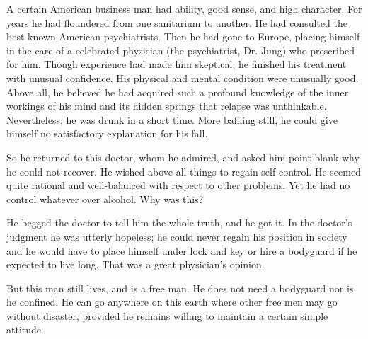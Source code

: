 \begin{biblechapter}
    A certain American business man had ability, 
    good sense, 
    and high character. 
\verse For years he had floundered from one sanitarium to another. 
\verse He had consulted the best known American psychiatrists. 
\verse Then he had gone to Europe, 
    placing himself in the care of a celebrated physician 
    (the psychiatrist, Dr. Jung) 
    who prescribed for him. 
\verse Though experience had made him skeptical, 
    he finished his treatment with unusual confidence. 
\verse His physical and mental condition were unusually good. 
\verse Above all, he believed he had acquired such a profound knowledge 
    of the inner workings of his mind 
    and its hidden springs that relapse was unthinkable. 
\verse Nevertheless, he was drunk in a short time. 
\verse More baffling still, 
    he could give himself no satisfactory explanation for his fall.

\verse So he returned to this doctor, whom he admired, 
    and asked him point-blank why he could not recover. 
\verse He wished above all things to regain self-control. 
\verse He seemed quite rational and well-balanced 
    with respect to other problems. 
\verse Yet he had no control whatever over alcohol. 
\verse Why was this?

\verse He begged the doctor to tell him the whole truth, and he got it. 
\verse In the doctor's judgment he was utterly hopeless; 
    he could never regain his position in society 
    and he would have to place himself under lock and key 
    or hire a bodyguard if he expected to live long. 
\verse That was a great physician's opinion.

\verse But this man still lives, and is a free man. 
\verse He does not need a bodyguard nor is he confined. 
\verse He can go anywhere on this earth 
    where other free men may go without disaster, 
    provided he remains willing to maintain a certain simple attitude.
\end{biblechapter}


